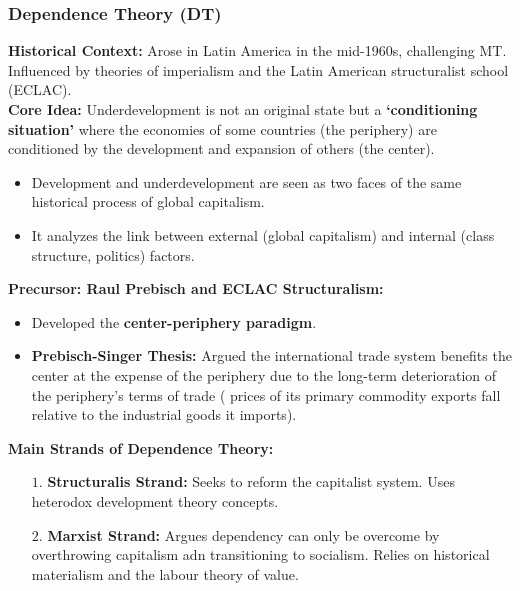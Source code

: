\documentclass{article}
\begin{document}
    \subsubsection{Dependence Theory (DT)}
    \noindent \textbf{Historical Context:} Arose in Latin America in the
mid-1960s, challenging MT. Influenced by theories of imperialism and the
Latin American structuralist school (ECLAC).\\

    \noindent \textbf{Core Idea:} Underdevelopment is not an original state
but a \textbf{`conditioning situation'} where the economies of some
countries (the periphery) are conditioned by the development and expansion
of others (the center).
    \begin{itemize}
        \item Development and underdevelopment are seen as two faces of the
same historical process of global capitalism.
        \item It analyzes the link between external (global capitalism) and
        internal (class structure, politics) factors.
    \end{itemize}

    \noindent \textbf{Precursor: Raul Prebisch and ECLAC Structuralism:}
    \begin{itemize}
        \item Developed the \textbf{center-periphery paradigm}.
        \item \textbf{Prebisch-Singer Thesis:} Argued the international
        trade system benefits the center at the expense of the periphery due
        to the long-term deterioration of the periphery's terms of trade (
        prices of its primary commodity exports fall relative to the
        industrial goods it imports).
    \end{itemize}

    \noindent \textbf{Main Strands of Dependence Theory:}
    \begin{itemize}
        \item [$1$.] \textbf{Structuralis Strand:} Seeks to reform the
        capitalist system. Uses heterodox development theory concepts.
        \item[$2$.] \textbf{Marxist Strand:} Argues dependency can only be
        overcome by overthrowing capitalism adn transitioning to socialism.
        Relies on historical materialism and the labour theory of value.
    \end{itemize}
\end{document}

